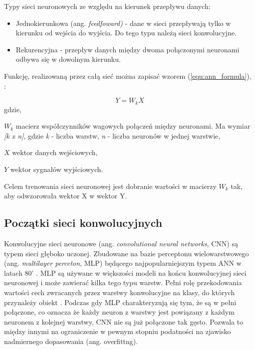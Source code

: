 {\parindent0pt %
Typy sieci neuronowych ze względu na kierunek przepływu danych:
\begin{itemize}
\item{Jednokierunkowa (ang. \textit{feedfoward)} - dane w sieci przepływają tylko w kierunku od wejścia do wyjścia. Do tego typu należą sieci konwolucyjne.}
\item{Rekurencyjna - przepływ danych między dwoma połączonymi neuronami odbywa się w dowolnym kierunku.}
\end{itemize}

Funkcję, realizowaną przez całą sieć można zapisać wzorem (\ref{equ:ann_formula}), \cite{tadeusiewicz_sn}:

\begin{equation}
Y = W_k X
\label{equ:ann_formula}
\end{equation}
gdzie,
\begin{eqwhere}[2cm]
	\item[$W_k$] macierz współczynników wagowych połączeń między neuronami. Ma wymiar \textit{[k x n]}, gdzie \textit{k} - liczba warstw, \textit{n} - liczba neuronów w jednej warstwie,
	\item[$X$] wektor danych wejściowych,
	\item[$Y$] wektor sygnałów wyjściowych.
\end{eqwhere}

Celem trenowania sieci neuronowej jest dobranie wartości w macierzy \textit{$W_k$} tak, aby odwzorowała wektor X w wektor Y. 
}
\subsection{Początki sieci konwolucyjnych}

Konwolucyjne sieci neuronowe (ang. \textit{convolutional neural networks}, CNN) są typem sieci głęboko uczonej. Zbudowane na bazie perceptonu wielowarstwowego (ang. \textit{multilayer perceton}, MLP) \cite{deep_learning} będącego  najpopularniejszym typem ANN w latach 80' \cite{Wasserman1988NeuralNI}. MLP są używane w większości modeli na końcu konwolucyjnej sieci neuronowej i może zawierać kilka tego typu warstw. Pełni rolę przekodowania wartości cech zwracanych przez warstwy konwolucyjne na klasy, do których przynależy obiekt \cite{Krizhevsky2012ImageNetCW}. Podczas gdy MLP charakteryzują się tym, że są w pełni połączone, co oznacza że każdy neuron z warstwy jest powiązany z każdym neuronem z kolejnej warstwy, CNN nie są już połączone tak gęsto. Pozwala to między innymi na ograniczenie w pewnym stopniu podatności na zjawisko nadmiernego dopasowania (ang. {overfittng}). 

